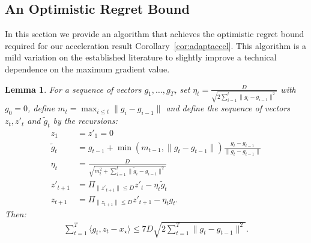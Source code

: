 \documentclass{article}
\newtheorem{lemma}{Lemma}
\begin{document}
\subsection{An Optimistic Regret Bound}\label{sec:optimisticbound}
In this section we provide an algorithm that achieves the optimistic regret bound required for our acceleration result Corollary~\ref{cor:adaptaccel}. This algorithm is a mild variation on the established literature \citep{rakhlin2013online, chiang2012online, hazan2010extracting, joulani2017modular} to slightly improve a technical dependence on the maximum gradient value. 

\begin{lemma}\label{lem:simpleomd}
For a sequence of vectors $g_1,\dots,g_T$, set $\eta_t = \frac{D}{\sqrt{2\sum_{i=1}^t \|g_i-g_{i-1}\|^2}}$ with $g_0=0$, define $m_t = \max_{i\le t} \|g_i-g_{i-1}\|$ and define the sequence of vectors $z_t, z'_t$ and $\tilde g_t$ by the recursions:
\begin{align*}
z_1&=z'_1=0\\
\tilde g_t &= g_{t-1} + \min\left(m_{t-1}, \|g_t-g_{t-1}\|\right)\frac{g_t-g_{t-1}}{\|g_t- g_{t-1}\|}\\
\eta_t &= \frac{D}{ \sqrt{m_t^2+\sum_{i=1}^t \|\tilde g_i-g_{i-1}\|^2}}\\
    z'_{t+1}&=\Pi_{\|z'_{t+1}\|\le D} z'_t -\eta_t \tilde g_t\\
    z_{t+1} &= \Pi_{\|z_{t+1}\|\le D} z'_{t+1} -\eta_t g_t.
\end{align*}
Then:
\begin{align*}
    \sum_{t=1}^T \langle g_t, z_t -x_\star\rangle \le 7D\sqrt{2\sum_{t=1}^T \|g_t-g_{t-1}\|^2}.
\end{align*}
\end{lemma}
\end{document}
